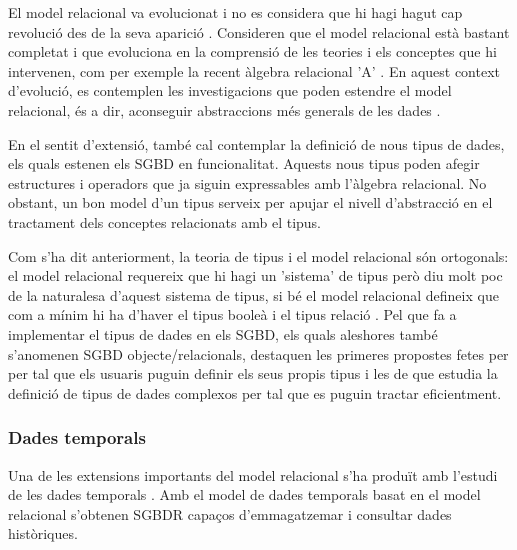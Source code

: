 El model relacional va evolucionat i no es considera que hi hagi hagut
cap revolució des de la seva aparició
\parencite[cap.~19]{date06}. %
Consideren que el model relacional està bastant completat i que
evoluciona en la comprensió de les teories i els conceptes que hi
intervenen, com per exemple la recent àlgebra relacional
'A' \parencite[ap.~A]{date06:_datab_types_relat_model}.  En aquest
context d'evolució, es contemplen les investigacions que poden
estendre el model relacional, és a dir, aconseguir abstraccions més
generals de les dades \parencite[cap.~25]{date06}. %


En el sentit d'extensió, també cal contemplar la definició de nous
tipus de dades, els quals estenen els SGBD en funcionalitat.  Aquests
nous tipus poden afegir estructures i operadors que ja siguin
expressables amb l'àlgebra relacional. No obstant, un bon model d'un
tipus serveix per apujar el nivell d'abstracció en el tractament dels
conceptes relacionats amb el
tipus. %

Com s'ha dit anteriorment, la teoria de tipus i el model relacional
són ortogonals: el model relacional requereix que hi hagi un 'sistema'
de tipus però diu molt poc de la naturalesa d'aquest sistema de tipus,
si bé el model relacional defineix que com a mínim hi ha d'haver el
tipus booleà i el tipus relació \parencite{date:thethirdmanifesto}. Pel que
fa a implementar el tipus de dades en els SGBD, els quals aleshores
també s'anomenen SGBD objecte/relacionals, destaquen les primeres
propostes fetes per \textcite{stonebraker86} per tal que els usuaris
puguin definir els seus propis tipus i les de
\textcite{seshadri98:_enhan} que estudia la definició de tipus de
dades complexos per tal que es puguin tractar eficientment.




\subsubsection{Dades temporals}

Una de les extensions importants del model relacional s'ha produït amb
l'estudi de les dades
temporals \parencite{date02:_tempor_data_relat_model}. Amb el model de
dades temporals basat en el model relacional s'obtenen SGBDR capaços
d'emmagatzemar i consultar dades històriques.

